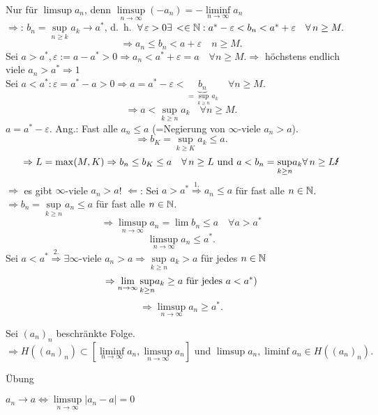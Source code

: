 \documentclass[../ana1.tex]{subfiles}
\begin{document}
\begin{bew}
	Nur für \( \limsup a_n \), denn \( \limsup\limits_{n\rightarrow\infty}(-a_n) = -\liminf\limits_{n\rightarrow\infty} a_n \) \\
	\glqq{}\(\Rightarrow \)\grqq{}: \(b_n = \underset{n\geq k}{\sup}a_k \rightarrow a^* \), d.\ h.\  \(\forall \varepsilon>0\exists <\in\N: a^*-\varepsilon < b_n < a^* + \varepsilon \quad \forall n\geq M. \) \\
	\[ \Rightarrow a_n \leq b_n < a + \varepsilon \quad n\geq M. \]
	Sei \(  a>a^*, \varepsilon := a-a^* >0 \Rightarrow a_n < a^* + \varepsilon = a \quad \forall n\geq M. \Rightarrow \) höchstens endlich viele \( a_n >a^* \Rightarrow 1 \) \\
	Sei \( a< a^*: \varepsilon = a^*-a >0 \Rightarrow a=a^*-\varepsilon < \underbrace{b_n}_{=\underset{k\geq n}{\sup} a_k} \quad \forall n\geq M. \) \\
	\[ \Rightarrow a < \underset{k\geq n}{\sup} a_k \quad \forall n\geq M. \]
	\(a=a^* - \varepsilon \).
	Ang.: Fast alle \(a_n \leq a \) (=Negierung von \( \infty \)-viele \(a_n>a\)).\\
	\[ \Rightarrow b_K = \underset{k\geq K}{\sup} a_k \leq a. \]
	\[ \Rightarrow L = \max(M,K) \Rightarrow b_n \leq b_K \leq a \quad \forall n\geq L \text{ und } a<b_n=\underset{k\geq n}{\sup}a_k \forall n\geq L \text{\Lightning} \]
	\( \Rightarrow \) es gibt \(\infty \)-viele \(a_n>a\)!
	\glqq{}\(\Leftarrow \)\grqq{}: Sei \(a>a^* \overset{\text{1.}}{\Rightarrow} a_n \leq a \) für fast alle \(n\in\mathbb{N} \). \\
	\( \Rightarrow b_n = \underset{k\geq n}{\sup}a_n \leq a \) für fast alle \(n\in\mathbb{N} \). \\
	\[ \Rightarrow \limsup\limits_{n\rightarrow\infty} a_n = \lim b_n \leq a \quad \forall a> a^* \]
	\[ \limsup\limits_{n\rightarrow\infty} a_n \leq a^*. \]
	Sei \(a<a^* \overset{\text{2.}}{\Rightarrow} \exists \infty \)-viele \(a_n > a \Rightarrow \underset{k\geq n}{\sup} a_k > a \) für jedes \(n\in\mathbb{N} \) 
	\[ \Rightarrow \lim\limits_{n\rightarrow\infty}\underset{k\geq n}{\sup}a_k \geq a \text{ für jedes }a<a^*) \]
	\[ \Rightarrow \limsup\limits_{n\rightarrow\infty} a_n\geq a^*. \]
\end{bew}
\begin{kor}
	Sei \({(a_n)}_n\) beschränkte Folge.
	\[ \Rightarrow H({(a_n)}_n) \subset [ \liminf\limits_{n\rightarrow\infty}a_n, \limsup\limits_{n\rightarrow\infty}a_n ] \text{ und } \limsup a_n, \liminf a_n \in H({(a_n)}_n). \]
\end{kor}
\begin{bew}
	Übung
\end{bew}
\(a_n \rightarrow a \Leftrightarrow \limsup\limits_{n\rightarrow\infty}|a_n - a| = 0 \)
\end{document}
